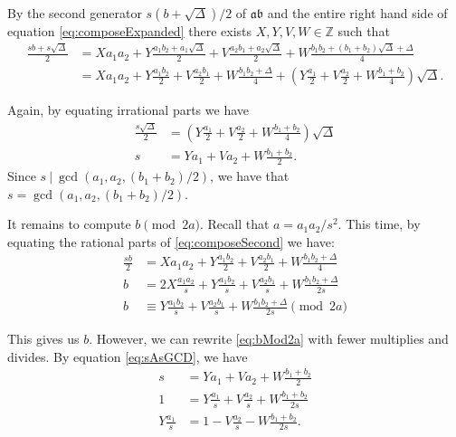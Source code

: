 \documentclass{ucalgthes1}
\theoremstyle{plain}
\theoremstyle{definition}
\newcommand{\ZZ}{\mathbb{Z}}
\begin{document}
By the second generator $s(b+\sqrt\Delta)/2$ of $\mathfrak{a}\mathfrak{b}$ and the entire right hand side of equation \eqref{eq:composeExpanded} there exists $X, Y, V, W \in \ZZ$ such that
\begin{equation}
\label{eq:composeSecond}
\begin{split}
	\frac{sb+s\sqrt\Delta}{2} & = Xa_1a_2 + Y\frac{a_1b_2+a_1\sqrt\Delta}{2} + V\frac{a_2b_1 + a_2\sqrt{\Delta}}{2} + W\frac{b_1b_2 + (b_1+b_2)\sqrt{\Delta} + \Delta}{4} \\
	& = Xa_1a_2 + Y\frac{a_1b_2}{2} + V\frac{a_2b_1}{2} + W\frac{b_1b_2 + \Delta}{4} + \left(Y\frac{a_1}{2} + V\frac{a_2}{2} + W\frac{b_1+b_2}{4}\right)\sqrt\Delta. 
\end{split}
\end{equation}

\noindent
Again, by equating irrational parts we have
\begin{align}
	\frac{s\sqrt\Delta}{2} & = \left(Y\frac{a_1}{2} + V\frac{a_2}{2} + W\frac{b_1+b_2}{4}\right)\sqrt\Delta \nonumber \\
	s & = Ya_1 + Va_2 + W\frac{b_1+b_2}{2}. \label{eq:sAsGCD}
\end{align}
Since $s~|~\gcd(a_1, a_2, (b_1+b_2)/2)$, we have that $s = \gcd(a_1, a_2, (b_1+b_2)/2)$.  

It remains to compute $b \pmod{2a}$.  Recall that $a = a_1a_2/s^2$.  This time, by equating the rational parts of \eqref{eq:composeSecond} we have:
\begin{align}
	\frac{sb}{2} & = Xa_1a_2 + Y\frac{a_1b_2}{2} + V\frac{a_2b_1}{2} + W\frac{b_1b_2 + \Delta}{4} \nonumber \\
	b & = 2X\frac{a_1a_2}{s} + Y\frac{a_1b_2}{s} + V\frac{a_2b_1}{s} + W\frac{b_1b_2 + \Delta}{2s} \nonumber \\
	b & \equiv Y\frac{a_1b_2}{s} + V\frac{a_2b_1}{s} + W\frac{b_1b_2 + \Delta}{2s} \pmod{2a} \label{eq:bMod2a}
\end{align}

\noindent
This gives us $b$.  However, we can rewrite \eqref{eq:bMod2a} with fewer multiplies and divides.  By equation \eqref{eq:sAsGCD}, we have
\begin{align*}
	s & = Ya_1 + Va_2 + W\frac{b_1+b_2}{2} \\
	1 & = Y\frac{a_1}{s} + V\frac{a_2}{s} + W\frac{b_1+b_2}{2s} \\
	Y\frac{a_1}{s} & = 1 - V\frac{a_2}{s} - W\frac{b_1+b_2}{2s}.
\end{align*}
\end{document}
